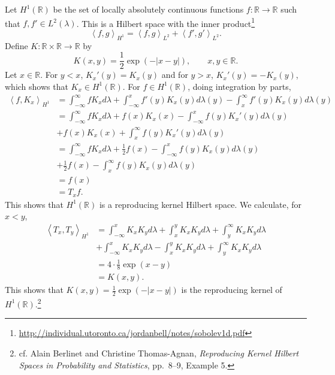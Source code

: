 \documentclass{article}
\newcommand{\inner}[2]{\left\langle #1, #2 \right\rangle}
\theoremstyle{definition}
\begin{document}
Let $H^1(\mathbb{R})$ be the set of locally absolutely continuous functions
$f:\mathbb{R} \to \mathbb{R}$ such that 
$f, f' \in L^2(\lambda)$. This is a Hilbert space with the inner product\footnote{\url{http://individual.utoronto.ca/jordanbell/notes/sobolev1d.pdf}}
\[
\inner{f}{g}_{H^1} = \inner{f}{g}_{L^2}+\inner{f'}{g'}_{L^2}.
\]
Define $K:\mathbb{R} \times \mathbb{R} \to \mathbb{R}$ by
\[
K(x,y) = \frac{1}{2}\exp(-|x-y|),\qquad x,y \in \mathbb{R}.
\]
Let $x \in \mathbb{R}$. For $y<x$, $K_x'(y) = K_x(y)$ and for $y>x$, $K_x'(y) = -K_x(y)$, which shows
that $K_x \in H^1(\mathbb{R})$. For $f \in H^1(\mathbb{R})$, doing integration by parts,
\begin{align*}
\inner{f}{K_x}_{H^1}&=\int_{-\infty}^\infty f K_x d\lambda + \int_{-\infty}^x f'(y) K_x(y) d\lambda(y)
-\int_x^\infty f'(y) K_x(y) d\lambda(y)\\
&=\int_{-\infty}^\infty f K_x d\lambda + f(x) K_x(x) - \int_{-\infty}^x f(y) K_x'(y) d\lambda(y)\\
&+f(x)K_x(x) + \int_x^\infty f(y) K_x'(y) d\lambda(y)\\
&=\int_{-\infty}^\infty f K_x d\lambda + \frac{1}{2} f(x) -\int_{-\infty}^x f(y) K_x(y) d\lambda(y)\\
&+\frac{1}{2}f(x)-\int_x^\infty f(y) K_x(y) d\lambda(y)\\
&=f(x)\\
&=T_x f.
\end{align*}
This shows that $H^1(\mathbb{R})$ is a reproducing kernel Hilbert space.
We calculate, for $x<y$,
\begin{align*}
\inner{T_x}{T_y}_{H^1}&=\int_{-\infty}^x K_x K_y d\lambda+ \int_x^y K_xK_y d\lambda
+\int_y^\infty K_x K_y d\lambda\\
&+\int_{-\infty}^x K_x K_y d\lambda-\int_x^y K_xK_y d\lambda
+\int_y^\infty K_x K_y d\lambda\\
&=4\cdot \frac{1}{8} \exp(x-y)\\
&=K(x,y).
\end{align*}
This shows that $K(x,y) =  \frac{1}{2}\exp(-|x-y|)$ is the reproducing kernel of $H^1(\mathbb{R})$.\footnote{cf. Alain Berlinet and Christine Thomas-Agnan, {\em Reproducing Kernel Hilbert Spaces
in Probability and Statistics}, pp.~8--9, Example 5.}
\end{document}
